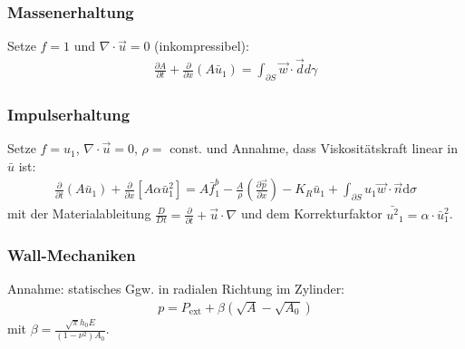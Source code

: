 \begin{frame}\frametitle{Massenerhaltung}
Setze $f=1$ und $\nabla \cdot \vec u = 0$ (inkompressibel):
\begin{align}
  \frac{\partial A}{\partial t} + \frac{\partial}{\partial x} (A \bar u_1) = \int_{\partial S} \vec w \cdot \vec d d\gamma %
\end{align}
\end{frame}

\begin{frame}\frametitle{Impulserhaltung}
  Setze $f=u_1$, $\nabla \cdot \vec u = 0$, $\rho=$ const. und Annahme, dass Viskositätskraft linear in $\bar{u}$ ist:
\begin{align}
\boxed{
\frac{\partial}{\partial t} (A \bar u_1) + \frac{\partial}{\partial x} \left[ A \alpha \bar{u}_1^2 \right] = A \bar{f}^b_1 - \frac{A}{\rho}\left(\frac{\partial \vec{p}}{\partial x}\right)- K_R \bar{u}_1 + \int_{\partial S}u_1 \vec{w}\cdot \vec{n}\text{d}\sigma}
\end{align}
  mit der Materialableitung $\frac{D}{Dt}=\frac{\partial}{\partial t}+\vec{u}\cdot \nabla$ und dem Korrekturfaktor $\bar{u^2}_1=\alpha \cdot \bar{u}_1^2$. %
  \end{frame}
\begin{frame}
\frametitle{Wall-Mechaniken}
Annahme: statisches Ggw. in radialen Richtung im Zylinder:
\begin{align}
p=P_\text{ext}+\beta(\sqrt{A}-\sqrt{A_0})
\end{align}
mit $\beta = \frac{\sqrt{\pi}h_0E}{(1-\nu^2)A_0}$.
\end{frame}



